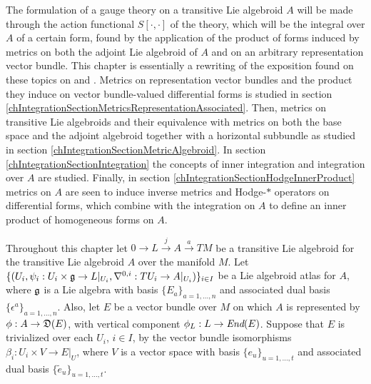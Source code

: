 The formulation of a gauge theory on a transitive Lie algebroid $A$ will be made through the action functional $S[\cdot, \cdot]$ of the theory, which will be the %
integral over $A$ of a certain form, found by the application of the product of forms induced by metrics on both the adjoint Lie algebroid of $A$ and on an arbitrary representation vector bundle.
This chapter is essentially a rewriting of the exposition found on these topics on \cite{Fournel2011} and \cite{Fournel2013}. Metrics on representation vector bundles and the product they induce on vector bundle-valued differential forms is studied in section \ref{chIntegrationSectionMetricsRepresentationAssociated}. Then, metrics on transitive Lie algebroids and their equivalence with metrics on both the base space and the adjoint algebroid together with a horizontal subbundle as studied in section \ref{chIntegrationSectionMetricAlgebroid}. In section \ref{chIntegrationSectionIntegration} the concepts of inner integration and integration over $A$ are studied. Finally, in section \ref{chIntegrationSectionHodgeInnerProduct} metrics on $A$ are seen to induce inverse metrics and Hodge-$*$ operators on differential forms, which combine with the integration on $A$ to define an inner product of homogeneous forms on $A$.

Throughout this chapter let $0 \to L \xrightarrow{j} A \xrightarrow{a} TM$ be a transitive Lie algebroid for the transitive Lie algebroid $A$ over the manifold $M$.
Let $\{(U_i, \psi_i: U_i \times \mathfrak{g} \to L|_{U_i}, \nabla^{0, i}: TU_i \to A|_{U_i})\}_{i \in I}$ be a Lie algebroid atlas for $A$, where $\mathfrak{g}$ is a Lie algebra with basis $\{E_a\}_{a = 1, \dots, n}$ and associated dual basis $\{\epsilon^a\}_{a = 1, \dots, n}$.
Also, let $E$ be a vector bundle over $M$ on which $A$ is represented by $\phi: A \to \alg D(E)$, with vertical component $\phi_L: L \to \End(E)$. Suppose that $E$ is trivialized over each $U_i$, $i \in I$, by the vector bundle isomorphisms $\beta_i: U_i \times V \to E|_U$, where $V$ is a vector space with basis $\{e_u\}_{u = 1, \dots, t}$ and associated dual basis $\{\tilde e_u\}_{u = 1, \dots, t}$.

